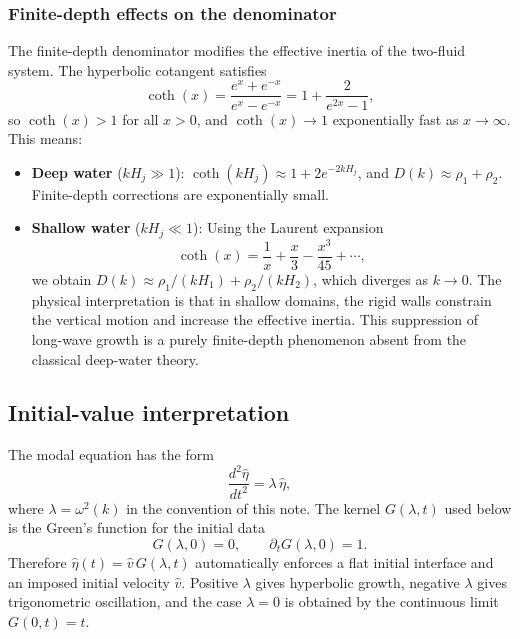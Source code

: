 \documentclass[11pt,a4paper]{article}
\begin{document}
\subsubsection{Finite-depth effects on the denominator}

The finite-depth denominator modifies the effective inertia of the two-fluid system.  The hyperbolic cotangent satisfies
\begin{equation}
    \coth(x) = \frac{e^x+e^{-x}}{e^x-e^{-x}}
    =
    1 + \frac{2}{e^{2x}-1},
\end{equation}
so $\coth(x)>1$ for all $x>0$, and $\coth(x)\to 1$ exponentially fast as $x\to\infty$.  This means:
\begin{itemize}[leftmargin=*]
    \item \textbf{Deep water} ($kH_j\gg 1$): $\coth(kH_j)\approx 1 + 2e^{-2kH_j}$, and $D(k)\approx \rho_1+\rho_2$.  Finite-depth corrections are exponentially small.
    \item \textbf{Shallow water} ($kH_j\ll 1$): Using the Laurent expansion
    \begin{equation}
        \coth(x) = \frac{1}{x} + \frac{x}{3} - \frac{x^3}{45} + \cdots,
    \end{equation}
    we obtain $D(k)\approx \rho_1/(kH_1) + \rho_2/(kH_2)$, which diverges as $k\to 0$.  The physical interpretation is that in shallow domains, the rigid walls constrain the vertical motion and increase the effective inertia.  This suppression of long-wave growth is a purely finite-depth phenomenon absent from the classical deep-water theory.
\end{itemize}


\subsection{Initial-value interpretation}

The modal equation has the form
\begin{equation}
    \frac{d^2\widehat{\eta}}{dt^2}
    =
    \lambda\,\widehat{\eta},
\end{equation}
where $\lambda=\omega^2(k)$ in the convention of this note.  The kernel $G(\lambda,t)$ used below is the Green's function for the initial data
\begin{equation}
    G(\lambda,0)=0,
    \qquad
    \partial_tG(\lambda,0)=1.
\end{equation}
Therefore $\widehat{\eta}(t)=\widehat{v}\,G(\lambda,t)$ automatically enforces a flat initial interface and an imposed initial velocity $\widehat{v}$.  Positive $\lambda$ gives hyperbolic growth, negative $\lambda$ gives trigonometric oscillation, and the case $\lambda=0$ is obtained by the continuous limit $G(0,t)=t$.
\end{document}

